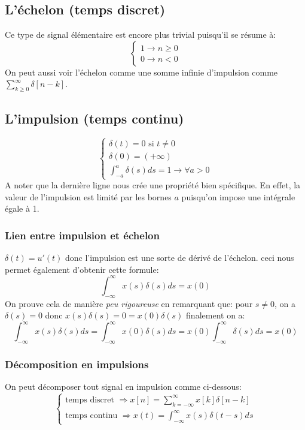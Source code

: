 \documentclass{report}
\begin{document}
\subsection{L'échelon (temps discret)}
Ce type de signal élémentaire est encore plus trivial puisqu'il se résume à:
\begin{equation}\label{eq:1}
\begin{cases}
1 \rightarrow n \geq 0 \\
0 \rightarrow n < 0
\end{cases}
\end{equation}
On peut aussi voir l'échelon comme une somme infinie d'impulsion comme $\sum_{k \geq 0}^{\infty} \delta[n-k]$.

\subsection{L'impulsion (temps continu)}
\begin{equation}
\begin{cases}
\delta (t) = 0 \text{ si } t \neq 0\\
\delta (0) = (+\infty)\\
\int_{-a}^a \delta (s) ds = 1 \rightarrow \forall a > 0
\end{cases}
\end{equation}
A noter que la dernière ligne nous crée une propriété bien spécifique. En effet, la valeur de l'impulsion est limité par les bornes $a$ puisqu'on impose une intégrale égale à 1.

\subsubsection{Lien entre impulsion et échelon}
$\delta (t) = u'(t)$ donc l'impulsion est une sorte de dérivé de l'échelon. ceci nous permet également d'obtenir cette formule:
\begin{equation}
\int_{-\infty}^{\infty} x(s) \delta(s)ds = x(0)
\end{equation}
On prouve cela de manière \textit{peu rigoureuse} en remarquant que: pour $s \neq 0$, on a $\delta(s) = 0$ donc $x(s)\delta(s) = 0 = x(0)\delta(s)$ finalement on a:
\begin{equation}
\int_{-\infty}^{\infty} x(s) \delta(s)ds = \int_{-\infty}^{\infty} x(0) \delta(s)ds = x(0) \int_{-\infty}^{\infty} \delta(s)ds = x(0)
\end{equation} 

\subsubsection{Décomposition en impulsions}
On peut décomposer tout signal en impulsion comme ci-dessous:
\begin{equation}
\begin{cases}
\text{temps discret } \Rightarrow x[n] = \sum_{k=-\infty}^{\infty}x[k]\delta[n-k] \\
\text{temps continu } \Rightarrow x(t) = \int_{-\infty}^{\infty} x(s) \delta(t-s)ds
\end{cases}
\end{equation}
\end{document}
